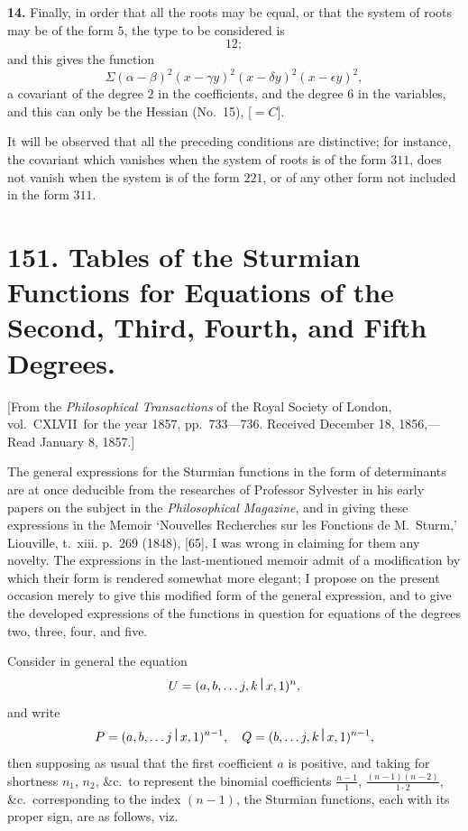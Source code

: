 \documentclass[12pt,a4paper]{article}
\theoremstyle{definition}
\begin{document}
\medskip
\noindent\textbf{14.} Finally, in order that all the roots may be equal, or that the system of roots may be of the form $5$, the type to be considered is
\[12;\]
and this gives the function
\[
\Sigma(\alpha-\beta)^2(x-\gamma y)^2(x-\delta y)^2(x-\epsilon y)^2,
\]
a covariant of the degree $2$ in the coefficients, and the degree $6$ in the variables, and this can only be the Hessian (No.~15), [$=C$].

It will be observed that all the preceding conditions are distinctive; for instance, the covariant which vanishes when the system of roots is of the form $311$, does not vanish when the system is of the form $221$, or of any other form not included in the form $311$.

\newpage

\section*{151. Tables of the Sturmian Functions for Equations of the Second, Third, Fourth, and Fifth Degrees.}

[From the \textit{Philosophical Transactions} of the Royal Society of London, vol.~CXLVII\ for the year 1857, pp.~733---736.
Received December 18, 1856,---Read January 8, 1857.]

\bigskip

The general expressions for the Sturmian functions in the form of determinants are at once deducible from the researches of Professor Sylvester in his early papers on the subject in the \textit{Philosophical Magazine}, and in giving these expressions in the Memoir `Nouvelles Recherches sur les Fonctions de M.~Sturm,' Liouville, t.~xiii. p.~269 (1848), [65], I was wrong in claiming for them any novelty. The expressions in the last-mentioned memoir admit of a modification by which their form is rendered somewhat more elegant; I propose on the present occasion merely to give this modified form of the general expression, and to give the developed expressions of the functions in question for equations of the degrees two, three, four, and five.

Consider in general the equation
\[U=(a,b,\ldots j,k\,\raisebox{0.5ex}{\textbf{\textbar}}\,x,1)^n,\]
and write
\[P=(a,b,\ldots j\,\raisebox{0.5ex}{\textbf{\textbar}}\,x,1)^{n-1},\quad Q=(b,\ldots j,k\,\raisebox{0.5ex}{\textbf{\textbar}}\,x,1)^{n-1},\]
then supposing as usual that the first coefficient $a$ is positive, and taking for shortness $n_1$, $n_2$, \&c.\ to represent the binomial coefficients $\frac{n-1}{1}$, $\frac{(n-1)(n-2)}{1\cdot2}$, \&c.\ corresponding to the index $(n-1)$, the Sturmian functions, each with its proper sign, are as follows, viz.
\end{document}
